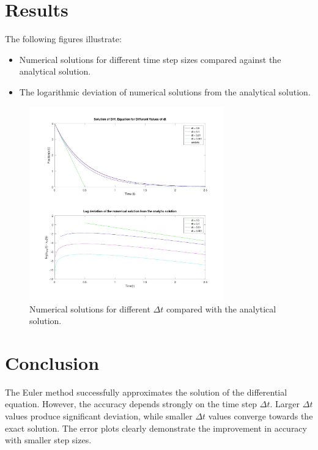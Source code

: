 \section*{Results}
The following figures illustrate:
\begin{itemize}
    \item Numerical solutions for different time step sizes compared against the analytical solution.
    \item The logarithmic deviation of numerical solutions from the analytical solution.
\end{itemize}

\begin{figure}[h!]
    \centering
    \includegraphics[width=0.75\textwidth]{a2.jpg}
    \caption{Numerical solutions for different $\Delta t$ compared with the analytical solution.}
\end{figure}

\section*{Conclusion}
The Euler method successfully approximates the solution of the differential equation. However, the accuracy depends strongly on the time step $\Delta t$. Larger $\Delta t$ values produce significant deviation, while smaller $\Delta t$ values converge towards the exact solution. The error plots clearly demonstrate the improvement in accuracy with smaller step sizes.
